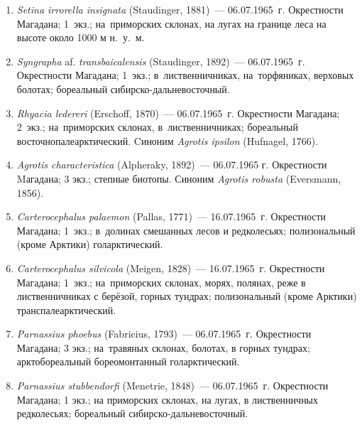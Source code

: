 \begin{enumerate}[noitemsep, leftmargin=0cm]

      \item \textit{Setina irrorella insignata} (Staudinger, 1881)~--- 06.07.1965~г. Окрестности Магадана; 1~экз.; на~приморских склонах, на лугах на границе леса на высоте около 1000 м н.~у.~м.


      \item \textit{Syngrapha} af. \textit{transbaicalensis} (Staudinger, 1892)~--- 06.07.1965~г. Окрестности Магадана; 1~экз.; в~лиственничниках, на~торфяниках, верховых болотах; бореальный сибирско-дальневосточный.

      \item \textit{Rhyacia ledereri} (Erschoff, 1870)~--- 06.07.1965~г. Окрестности Магадана; 2~экз.; на~приморских склонах, в~лиственничниках; бореальный восточнопалеарктический. Cиноним \textit{Agrotis ipsilon} (Hufnagel, 1766).

      \item \textit{Agrotis characteristica} (Alpheraky, 1892)~--- 06.07.1965 г. Окрестности Mагадана; 3 экз.; степные биотопы. Синоним \textit{Agrotis robusta} (Eversmann, 1856).


      \item \textit{Carterocephalus palaemon} (Pallas, 1771)~--- 16.07.1965~г. Окрестности Магадана; 1~экз.; в~долинах смешанных лесов и редколесьях; полизональный (кроме Арктики) голарктический.

      \item \textit{Carterocephalus silvicola} (Meigen, 1828)~--- 16.07.1965~г. Окрестности Магадана; 1~экз.; на~приморских склонах, морях, полянах, реже в лиственничниках с берёзой, горных тундрах; полизональный (кроме Арктики) транспалеарктический.


      \item \textit{Parnassius phoebus} (Fabricius, 1793)~--- 06.07.1965~г. Окрестности Магадана; 3 экз.; на~травяных склонах, болотах, в горных тундрах; арктобореальный бореомонтанный голарктический.

    \item \textit{Parnassius stubbendorfi} (Menetrie, 1848)~--- 06.07.1965~г. Окрестности Магадана; 1 экз.; на приморских склонах, на лугах, в лиственничных редколесьях; бореальный сибирско-дальневосточный.


\end{enumerate}
